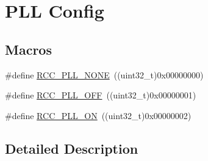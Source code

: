 \hypertarget{group___r_c_c___p_l_l___config}{\section{P\-L\-L Config}
\label{group___r_c_c___p_l_l___config}
}
\subsection*{Macros}
\begin{DoxyCompactItemize}
\item 
\#define \hyperlink{group___r_c_c___p_l_l___config_gae47a612f8e15c32917ee2181362d88f3}{R\-C\-C\-\_\-\-P\-L\-L\-\_\-\-N\-O\-N\-E}~((uint32\-\_\-t)0x00000000)
\item 
\#define \hyperlink{group___r_c_c___p_l_l___config_ga3a8d5c8bcb101c6ca1a574729acfa903}{R\-C\-C\-\_\-\-P\-L\-L\-\_\-\-O\-F\-F}~((uint32\-\_\-t)0x00000001)
\item 
\#define \hyperlink{group___r_c_c___p_l_l___config_gaf86dbee130304ba5760818f56d34ec91}{R\-C\-C\-\_\-\-P\-L\-L\-\_\-\-O\-N}~((uint32\-\_\-t)0x00000002)
\end{DoxyCompactItemize}


\subsection{Detailed Description}



